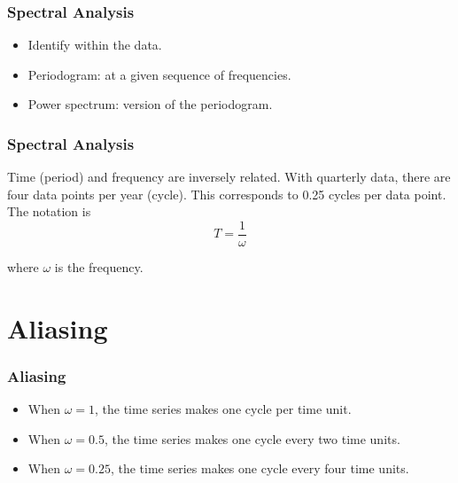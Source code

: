 \documentclass[%
xcolor=pdftex]{beamer}
\begin{document}
\begin{frame}
\frametitle{Spectral Analysis}

\begin{itemize}
\item Identify \underline{\hspace{35 mm}} within the data.
\item Periodogram: \underline{\hspace{25 mm}} at a given sequence of frequencies.
\item Power spectrum: \underline{\hspace{20 mm}} version of the periodogram.
\end{itemize}


\end{frame}


\begin{frame}
\frametitle{Spectral Analysis}

Time (period) and frequency are inversely related.  With quarterly data, there are four data points per year (cycle).  This corresponds to 0.25 cycles per data point.  The notation is
$$
T=\frac{1}{\omega}
$$

where $\omega$ is the frequency.

\end{frame}

\section{Aliasing}
\frame{\tableofcontents[currentsection]}

\begin{frame}
\frametitle{Aliasing}

\begin{itemize}
\item When $\omega=1$, the time series makes one cycle per time unit.
\item When $\omega=0.5$, the time series makes one cycle every two time units.
\item When $\omega=0.25$, the time series makes one cycle every four time units.
\end{itemize}

\end{frame}
\end{document}
